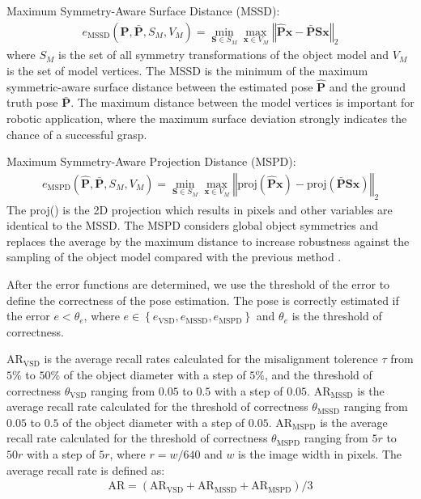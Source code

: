 \documentclass[12pt,DIV14,BCOR12mm,a4paper,footinclude=false,headinclude,parskip=half-,twoside,openright,cleardoublepage=empty,toc=index,bibliography=totoc,listof=totoc]{scrreprt}
\numberwithin{equation}{chapter}
\begin{document}
Maximum Symmetry-Aware Surface Distance (MSSD):
\begin{align}
  e_{\text{MSSD}}\left(\mathbf{\hat{P}},\mathbf{\bar{P}},S_{M},V_{M}\right)=\min_{\mathbf{S}\in S_{M}}\max_{\mathbf{x}\in V_{M}}\left\Vert \hat{\mathbf{P}}\mathbf{x}-\bar{\mathbf{P}}\mathbf{Sx}\right\Vert _{2} 
 \end{align}
where $S_{M}$ is the set of all symmetry transformations of the object model and $V_{M}$ is the set of model vertices. The MSSD is the minimum of the maximum symmetric-aware surface distance between the estimated pose $\mathbf{\hat{P}}$ and the ground truth pose $\mathbf{\bar{P}}$. The maximum distance between the model vertices is important for robotic application, where the maximum surface deviation strongly indicates the chance of a successful grasp.

Maximum Symmetry-Aware Projection Distance (MSPD):
\begin{align}
  e_{\text{MSPD}}\left(\mathbf{\hat{P}},\mathbf{\bar{P}},S_{M},V_{M}\right)=\min_{\mathbf{S}\in S_{M}}\max_{\mathbf{x}\in V_{M}}\left\Vert \text{proj}\left(\hat{\mathbf{P}}\mathbf{x}\right)-\text{proj}\left(\bar{\mathbf{P}}\mathbf{Sx}\right)\right\Vert _{2} 
 \end{align}
The proj() is the 2D projection which results in pixels and other variables are identical to the MSSD. The MSPD considers global object symmetries and replaces the average by the maximum distance to increase robustness against the sampling of the object model compared with the previous method \cite{7780735}.

After the error functions are determined, we use the threshold of the error to define the correctness of the pose estimation. The pose is correctly estimated if the error $e<\theta_{e}$, where $e\in \left\{e_{\text{VSD}},e_{\text{MSSD}},e_{\text{MSPD}}\right\}$ and $\theta_{e}$ is the threshold of correctness.

$\text{AR}_{\text{VSD}}$ is the average recall rates calculated for the misalignment tolerence $\tau$ from $5\%$ to $50\%$ of the object diameter with a step of $5\%$, and the threshold of correctness $\theta_{\text{VSD}}$ ranging from $0.05$ to $0.5$ with a step of $0.05$. $\text{AR}_{\text{MSSD}}$ is the average recall rate calculated for the threshold of correctness $\theta_{\text{MSSD}}$ ranging from $0.05$ to $0.5$ of the object diameter with a step of $0.05$. $\text{AR}_{\text{MSPD}}$ is the average recall rate calculated for the threshold of correctness $\theta_{\text{MSPD}}$ ranging from $5r$ to $50r$ with a step of $5r$, where $r=w/640$ and $w$ is the image width in pixels. The average recall rate is defined as:
\begin{align}
  \text{AR}=\left(\text{AR}_{\text{VSD}}+\text{AR}_{\text{MSSD}}+\text{AR}_{\text{MSPD}}\right)/3
\end{align}
\end{document}
